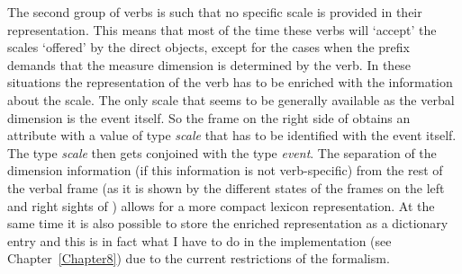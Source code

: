 
The second group of verbs is such that no specific scale is provided in their representation. This means that most of the time these verbs will `accept' the scales `offered' by the direct objects, except for the cases when the prefix demands that the measure dimension is determined by the verb. In these situations the representation of the verb has to be enriched with the information about the scale. The only scale that seems to be generally available as the verbal dimension is the event itself. So the frame on the right side of  obtains an attribute \VERBDIM with a value of type \textit{scale} that has to be identified with the event itself. The type \textit{scale} then gets conjoined with the type \textit{event}. The separation of the dimension information (if this information is not verb-specific) from the rest of the verbal frame (as it is shown by the different states of the frames on the left and right sights of ) allows for a more compact lexicon representation. At the same time it is also possible to store the enriched representation as a dictionary entry and this is in fact what I have to do in the implementation (see Chapter~\ref{Chapter8}) due to the current restrictions of the formalism. 
 


